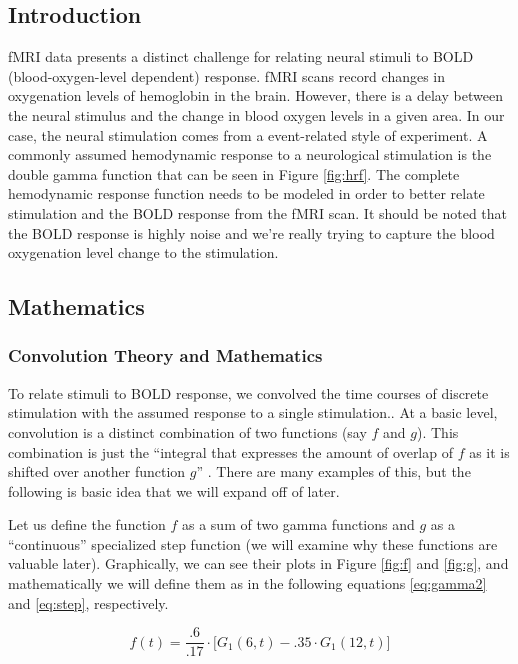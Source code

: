
\subsection{Introduction}

fMRI data presents a distinct challenge for relating neural stimuli 
to BOLD (blood-oxygen-level dependent) response. fMRI scans record changes 
in oxygenation levels of hemoglobin in the brain. However, there is a delay 
between the neural stimulus and the change in blood oxygen levels in a given 
area. In our case, the neural stimulation comes from a event-related style of 
experiment. A commonly assumed hemodynamic response to a neurological 
stimulation is the double gamma function that can be seen in Figure 
\ref{fig:hrf}. The complete hemodynamic response function needs to be modeled 
in order to better relate stimulation and the BOLD response from the fMRI scan.
It should be noted that the BOLD response is highly noise and we're really 
trying to capture the blood oxygenation level change to the stimulation.

\subsection{Mathematics}
\subsubsection{Convolution Theory and Mathematics}

To relate stimuli to BOLD response, we convolved the time courses of discrete 
stimulation with the assumed response to a single stimulation.. At a basic 
level, convolution is a distinct combination of two functions (say $f$ and 
$g$). This combination is just the ``integral that expresses the amount of 
overlap of $f$ as it is shifted over another function $g$'' 
\cite{weissten2015convolution}. 
There are many examples of this, but the following is basic idea that we will 
expand off of later. 

Let us define the function $f$ as a sum of two gamma functions and $g$ as a 
``continuous'' specialized step function (we will examine why these functions 
are valuable later). Graphically, we can see their plots in Figure \ref{fig:f}
and \ref{fig:g}, and mathematically we will define them as in the following 
equations \ref{eq:gamma2} and \ref{eq:step}, respectively.

\begin{equation} \label{eq:gamma2}
f(t)=\frac{.6}{.17}\cdot  \big[G_1(6,t)-.35 \cdot G_1(12,t) \big]
\end{equation}

